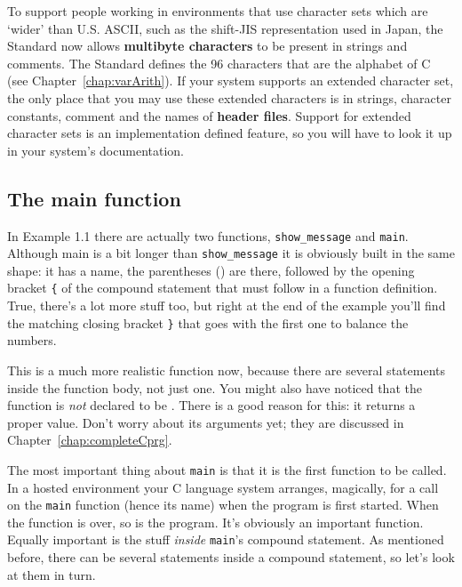    To support people working in environments that use character sets which
    are `wider' than U.S. ASCII, such as the shift-JIS representation
    used in Japan, the Standard now allows \textbf{multibyte characters} to
    be present in strings and comments. The Standard defines the
    96 characters that are the alphabet of C (see Chapter~\ref{chap:varArith}).
    If your system supports an extended character set, the only
    place that you may use these extended characters is in strings, character
    constants, comment and the names of \textbf{header files}. Support for
    extended character sets is an implementation defined feature, so you will
    have to look it up in your system's documentation.


  

  \subsection{The main function}
   

   In Example 1.1 there are actually two functions,
    \texttt{show\_message} and \texttt{main}. Although main is a bit
    longer than \texttt{show\_message} it is obviously built in the same
    shape: it has a name, the parentheses () are there, followed by the opening
    bracket \texttt{\{} of the compound statement that must follow in a
    function definition. True, there's a lot more stuff too, but right at the
    end of the example you'll find the matching closing bracket \texttt{\}}
    that goes with the first one to balance the numbers.


   This is a much more realistic function now, because there are several
    statements inside the function body, not just one. You might also have
    noticed that the function is \textit{not} declared to be
    \void. There is a good reason for this: it returns a proper
    value. Don't worry about its arguments yet; they are discussed in
    Chapter~\ref{chap:completeCprg}.


   The most important thing about \texttt{main} is that it is the first
    function to be called. In a hosted environment your C language system
    arranges, magically, for a call on the \texttt{main} function (hence
    its name) when the program is first started. When the function is over, so
    is the program. It's obviously an important function. Equally important is
    the stuff \textit{inside} \texttt{main}'s compound statement. As
    mentioned before, there can be several statements inside a compound
    statement, so let's look at them in turn.


